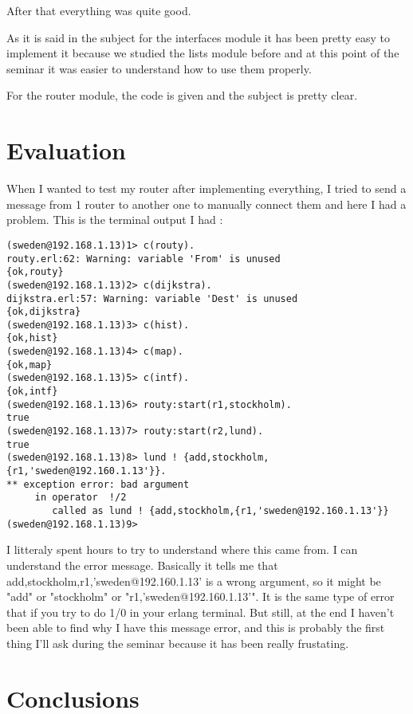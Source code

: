 \documentclass[a4paper, 11pt]{article}
\begin{document}
After that everything was quite good. 

As it is said in the subject for the interfaces module it has been pretty easy to implement it because we studied the lists module before and at this point of the seminar it was easier to understand how to use them properly.

For the router module, the code is given and the subject is pretty clear. 

\section{Evaluation}

When I wanted to test my router after implementing everything, I tried to send a message from 1 router to another one to manually connect them and here I had a problem.
This is the terminal output I had :

\begin{lstlisting}
(sweden@192.168.1.13)1> c(routy).
routy.erl:62: Warning: variable 'From' is unused
{ok,routy}
(sweden@192.168.1.13)2> c(dijkstra).
dijkstra.erl:57: Warning: variable 'Dest' is unused
{ok,dijkstra}
(sweden@192.168.1.13)3> c(hist).
{ok,hist}
(sweden@192.168.1.13)4> c(map).
{ok,map}
(sweden@192.168.1.13)5> c(intf).
{ok,intf}
(sweden@192.168.1.13)6> routy:start(r1,stockholm).
true
(sweden@192.168.1.13)7> routy:start(r2,lund).
true
(sweden@192.168.1.13)8> lund ! {add,stockholm,{r1,'sweden@192.160.1.13'}}.
** exception error: bad argument
     in operator  !/2
        called as lund ! {add,stockholm,{r1,'sweden@192.160.1.13'}}
(sweden@192.168.1.13)9> 
\end{lstlisting}

I litteraly spent hours to try to understand where this came from. I can understand the error message. Basically it tells me that {add,stockholm,{r1,'sweden@192.160.1.13'}} is a wrong argument, so it might be "add" or "stockholm" or "{r1,'sweden@192.160.1.13'}". It is the same type of error that if you try to do 1/0 in your erlang terminal. But still, at the end I haven't been able to find why I have this message error, and this is probably the first thing I'll ask during the seminar because it has been really frustating.

\section{Conclusions}
\end{document}
